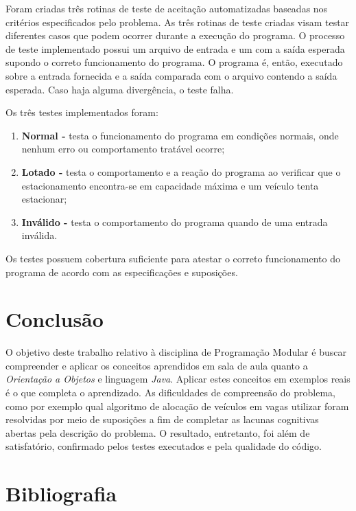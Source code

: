 \documentclass[a4paper,12pt]{article}
\begin{document}
Foram criadas três rotinas de teste de aceitação automatizadas baseadas nos critérios especificados pelo problema. As três rotinas de teste criadas visam testar diferentes casos que podem ocorrer durante a execução do programa. O processo de teste implementado possui um arquivo de entrada e um com a saída esperada supondo o correto funcionamento do programa. O programa é, então, executado sobre a entrada fornecida e a saída comparada com o arquivo contendo a saída esperada. Caso haja alguma divergência, o teste falha.

Os três testes implementados foram:
\begin{enumerate}
    \item \textbf{Normal -} testa o funcionamento do programa em condições normais, onde nenhum erro ou comportamento tratável ocorre;
    \item \textbf{Lotado -} testa o comportamento e a reação do programa ao verificar que o estacionamento encontra-se em capacidade máxima e um veículo tenta estacionar;
    \item \textbf{Inválido -} testa o comportamento do programa quando de uma entrada inválida.
\end{enumerate}

Os testes possuem cobertura suficiente para atestar o correto funcionamento do programa de acordo com as especificações e suposições.

\section{Conclusão}

O objetivo deste trabalho relativo à disciplina de Programação Modular é buscar compreender e aplicar os conceitos aprendidos em sala de aula quanto a \emph{Orientação a Objetos} e linguagem \emph{Java}. Aplicar estes conceitos em exemplos reais é o que completa o aprendizado. As dificuldades de compreensão do problema, como por exemplo qual algoritmo de alocação de veículos em vagas utilizar foram resolvidas por meio de suposições a fim de completar as lacunas cognitivas abertas pela descrição do problema. O resultado, entretanto, foi além de satisfatório, confirmado pelos testes executados e pela qualidade do código.

\section{Bibliografia}
\end{document}
